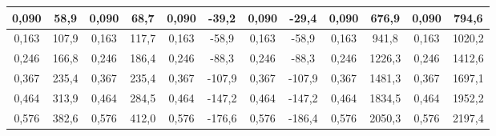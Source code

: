 \documentclass[a4paper,12pt]{article} %
\begin{document}
\begin{table}[H]
{\begin{tabular}{|cccc|cccc|cccc|}
			\multicolumn{1}{|c|}{0,090}         & \multicolumn{1}{c|}{58,9}                   & \multicolumn{1}{c|}{0,090}         & 68,7                   & \multicolumn{1}{c|}{0,090}         & \multicolumn{1}{c|}{-39,2}                  & \multicolumn{1}{c|}{0,090}         & -29,4                  & \multicolumn{1}{c|}{0,090}         & \multicolumn{1}{c|}{676,9}                  & \multicolumn{1}{c|}{0,090}         & 794,6                  \\ \hline
			\multicolumn{1}{|c|}{0,163}         & \multicolumn{1}{c|}{107,9}                  & \multicolumn{1}{c|}{0,163}         & 117,7                  & \multicolumn{1}{c|}{0,163}         & \multicolumn{1}{c|}{-58,9}                  & \multicolumn{1}{c|}{0,163}         & -58,9                  & \multicolumn{1}{c|}{0,163}         & \multicolumn{1}{c|}{941,8}                  & \multicolumn{1}{c|}{0,163}         & 1020,2                 \\ \hline
			\multicolumn{1}{|c|}{0,246}         & \multicolumn{1}{c|}{166,8}                  & \multicolumn{1}{c|}{0,246}         & 186,4                  & \multicolumn{1}{c|}{0,246}         & \multicolumn{1}{c|}{-88,3}                  & \multicolumn{1}{c|}{0,246}         & -88,3                  & \multicolumn{1}{c|}{0,246}         & \multicolumn{1}{c|}{1226,3}                 & \multicolumn{1}{c|}{0,246}         & 1412,6                 \\ \hline
			\multicolumn{1}{|c|}{0,367}         & \multicolumn{1}{c|}{235,4}                  & \multicolumn{1}{c|}{0,367}         & 235,4                  & \multicolumn{1}{c|}{0,367}         & \multicolumn{1}{c|}{-107,9}                 & \multicolumn{1}{c|}{0,367}         & -107,9                 & \multicolumn{1}{c|}{0,367}         & \multicolumn{1}{c|}{1481,3}                 & \multicolumn{1}{c|}{0,367}         & 1697,1                 \\ \hline
			\multicolumn{1}{|c|}{0,464}         & \multicolumn{1}{c|}{313,9}                  & \multicolumn{1}{c|}{0,464}         & 284,5                  & \multicolumn{1}{c|}{0,464}         & \multicolumn{1}{c|}{-147,2}                 & \multicolumn{1}{c|}{0,464}         & -147,2                 & \multicolumn{1}{c|}{0,464}         & \multicolumn{1}{c|}{1834,5}                 & \multicolumn{1}{c|}{0,464}         & 1952,2                 \\ \hline
			\multicolumn{1}{|c|}{0,576}         & \multicolumn{1}{c|}{382,6}                  & \multicolumn{1}{c|}{0,576}         & 412,0                  & \multicolumn{1}{c|}{0,576}         & \multicolumn{1}{c|}{-176,6}                 & \multicolumn{1}{c|}{0,576}         & -186,4                 & \multicolumn{1}{c|}{0,576}         & \multicolumn{1}{c|}{2050,3}                 & \multicolumn{1}{c|}{0,576}         & 2197,4                 \\ \hline

\end{tabular}}
\end{table}
\end{document}
